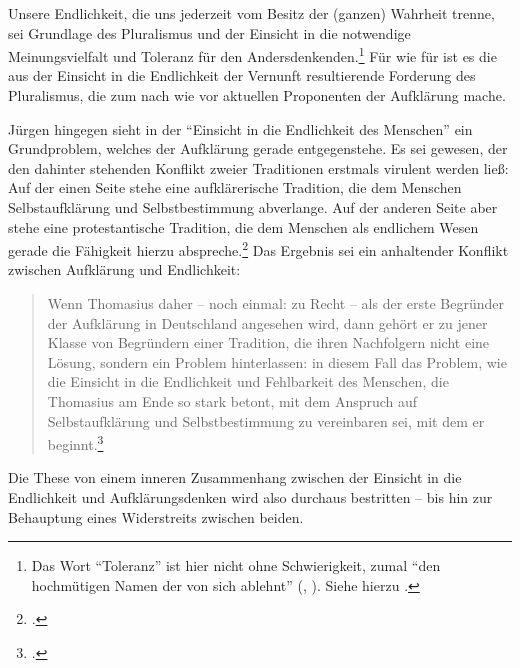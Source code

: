Unsere Endlichkeit, die uns jederzeit vom Besitz der (ganzen) Wahrheit trenne,
sei Grundlage des Pluralismus und der Einsicht in
die notwendige Meinungsvielfalt und Toleranz für den
Andersdenkenden.\footnote{Das Wort \enquote{Toleranz} ist hier nicht ohne
Schwierigkeit, zumal  \enquote{den hochmütigen Namen der
 von sich ablehnt}
(\cite[][A~491]{Kant:BeantwortungderFrage:WasistAufklaerung?1977}, \cite[][VIII:
40.30--31]{Kant:GesammelteWerke1900ff.}). Siehe hierzu
\cite{Weidemann:VonenquotebisweilenunvermeidlicherGeringschaetzung2010}.} Für
 wie für  ist es die aus der Einsicht in die
Endlichkeit der Vernunft resultierende Forderung des Pluralismus, die
 zum nach wie vor aktuellen Proponenten der Aufklärung mache.

Jürgen  hingegen sieht in der \enquote{Einsicht in die
Endlichkeit {\punkt} des Menschen} ein Grundproblem, welches der Aufklärung gerade
entgegenstehe. Es sei  gewesen, der den dahinter stehenden
Konflikt zweier Traditionen erstmals virulent werden ließ: Auf der einen Seite stehe eine
aufklärerische Tradition, die dem Menschen Selbstaufklärung und Selbstbestimmung
abverlange. Auf der anderen Seite aber stehe eine protestantische Tradition, die
dem Menschen als endlichem Wesen gerade die Fähigkeit hierzu
abspreche.\footnote{\cite[Vgl.][36]{Engfer:ChristianThomasius1989}.} Das
Ergebnis sei ein anhaltender Konflikt zwischen Aufklärung und Endlichkeit:
\begin{quote}
  Wenn Thomasius daher -- noch einmal: zu Recht -- als der erste Begründer der
Aufklärung in Deutschland angesehen wird, dann gehört er zu jener Klasse von Begründern
einer Tradition, die ihren Nachfolgern nicht eine Lösung, sondern ein Problem
hinterlassen: in diesem Fall das Problem, wie die Einsicht in die Endlichkeit
und Fehlbarkeit des Menschen, die Thomasius am Ende so stark betont, mit dem
Anspruch auf Selbstaufklärung und Selbstbestimmung zu vereinbaren sei, mit dem
er beginnt.\footcite[36]{Engfer:ChristianThomasius1989}
\end{quote}
Die These von einem inneren Zusammenhang zwischen der Einsicht in die
Endlichkeit und Aufklärungsdenken wird also durchaus bestritten --  bis hin zur
Behauptung eines Widerstreits zwischen beiden.



